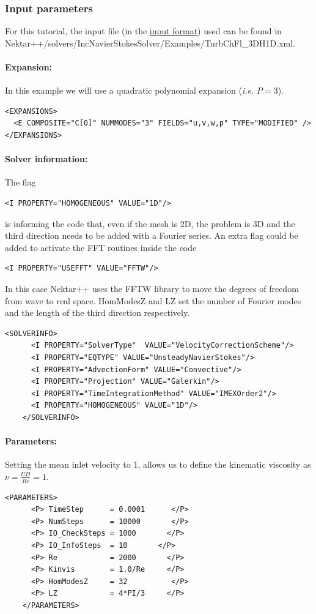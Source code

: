 \subsubsection{Input parameters}
For this tutorial, the input file (in the \hyperref[XMLformat]{\nekpp input format}) used can be found in Nektar++/solvers/IncNavierStokesSolver/Examples/TurbChFl\_3DH1D.xml.

\paragraph{Expansion:~} In this example we will use a quadratic polynomial expansion (\textit{i.e.} $P=3$).
\begin{lstlisting}[style=XMLStyle]
<EXPANSIONS>
  <E COMPOSITE="C[0]" NUMMODES="3" FIELDS="u,v,w,p" TYPE="MODIFIED" />
</EXPANSIONS>
\end{lstlisting}

\paragraph{Solver information:~} The flag 
\begin{lstlisting}[style=XMLStyle]
<I PROPERTY="HOMOGENEOUS" VALUE="1D"/>
\end{lstlisting}
is informing the code that, even if the mesh is 2D, the problem is 3D and the third direction needs to be added with a Fourier series. An extra flag could be added to activate the FFT routines inside the code 
\begin{lstlisting}[style=XMLStyle]
<I PROPERTY="USEFFT" VALUE="FFTW"/>
\end{lstlisting}
In this case Nektar++ uses the FFTW library to move the degrees of freedom from wave to real space. HomModesZ and LZ set the number of Fourier modes and the length of the third direction respectively.

\begin{lstlisting}[style=XMLStyle]
    <SOLVERINFO>
      <I PROPERTY="SolverType"  VALUE="VelocityCorrectionScheme"/>
      <I PROPERTY="EQTYPE" VALUE="UnsteadyNavierStokes"/>
      <I PROPERTY="AdvectionForm" VALUE="Convective"/>
      <I PROPERTY="Projection" VALUE="Galerkin"/>
      <I PROPERTY="TimeIntegrationMethod" VALUE="IMEXOrder2"/>
      <I PROPERTY="HOMOGENEOUS" VALUE="1D"/>
    </SOLVERINFO>
\end{lstlisting}

\paragraph{Parameters:~} Setting the mean inlet velocity to 1, allows us to define the kinematic viscosity as $\nu = \frac{UD}{Re}=1$.
\begin{lstlisting}[style=XMLStyle]
    <PARAMETERS>
      <P> TimeStep      = 0.0001      </P>
      <P> NumSteps      = 10000       </P>
      <P> IO_CheckSteps = 1000       </P>
      <P> IO_InfoSteps  = 10       </P>
      <P> Re            = 2000       </P>
      <P> Kinvis        = 1.0/Re     </P>
      <P> HomModesZ     = 32          </P>
      <P> LZ            = 4*PI/3     </P>
    </PARAMETERS>
\end{lstlisting}

